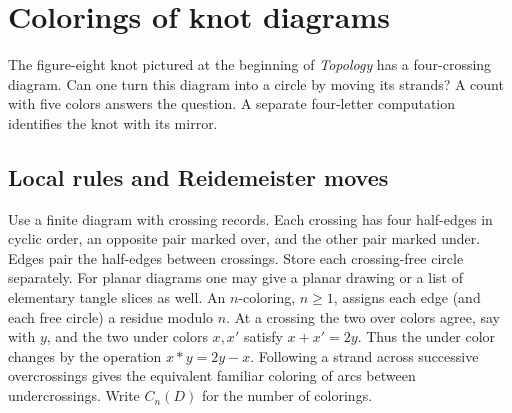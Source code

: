 \section{Colorings of knot diagrams}\label{sec:knotcolor}
The figure-eight knot pictured at the beginning of \emph{Topology} has
a four-crossing diagram. Can one turn this diagram into a circle by
moving its strands? A count with five colors answers the question.
A separate four-letter computation identifies the knot with its mirror.

\subsection{Local rules and Reidemeister moves}
Use a finite diagram with crossing records. Each crossing has four
half-edges in cyclic order, an opposite pair marked over, and the other
pair marked under. Edges pair the half-edges between crossings. Store
each crossing-free circle separately. For planar diagrams one may give a
planar drawing or a list of elementary tangle slices as well. An
$n$-coloring, $n\ge1$, assigns each edge (and each free circle) a residue
modulo $n$. At a crossing the two over colors agree, say with $y$, and the
two under colors $x,x'$ satisfy $x+x'=2y$. Thus the under color changes
by the operation $x*y=2y-x$. Following a strand across successive
overcrossings gives the equivalent familiar coloring of arcs between
undercrossings. Write $C_n(D)$ for the number of colorings.

